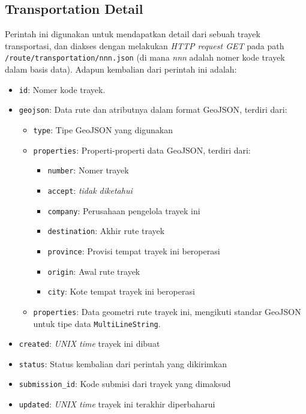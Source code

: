 \subsection{Transportation Detail}
Perintah ini digunakan untuk mendapatkan detail dari sebuah trayek transportasi, dan diakses dengan melakukan \textit{HTTP request GET} pada path \texttt{/route/transportation/nnn.json} (di mana \textit{nnn} adalah nomer kode trayek dalam basis data). Adapun kembalian dari perintah ini adalah:

\begin{itemize}
	\item \texttt{id}: Nomer kode trayek.
	\item \texttt{geojson}: Data rute dan atributnya dalam format
		GeoJSON\cite{geojson}, terdiri dari:
		\begin{itemize}
			\item \texttt{type}: Tipe GeoJSON yang digunakan
			\item \texttt{properties}: Properti-properti data GeoJSON, terdiri dari:
				\begin{itemize}
					\item \texttt{number}: Nomer trayek
					\item \texttt{accept}: \textit{tidak diketahui}
					\item \texttt{company}: Perusahaan pengelola trayek ini
					\item \texttt{destination}: Akhir rute trayek
					\item \texttt{province}: Provisi tempat trayek ini beroperasi
					\item \texttt{origin}: Awal rute trayek
					\item \texttt{city}: Kote tempat trayek ini beroperasi
				\end{itemize}
			\item \texttt{properties}: Data geometri rute trayek ini, mengikuti standar GeoJSON untuk tipe data \texttt{MultiLineString}.
		\end{itemize}
	\item \texttt{created}: \textit{UNIX time} trayek ini dibuat
	\item \texttt{status}: Status kembalian dari perintah yang dikirimkan
	\item \texttt{submission\_id}: Kode submisi dari trayek yang dimaksud
	\item \texttt{updated}: \textit{UNIX time} trayek ini terakhir diperbaharui
\end{itemize}

